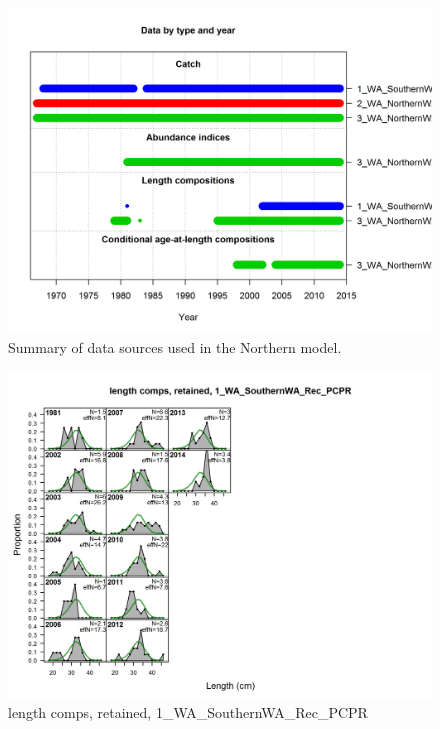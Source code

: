 \documentclass[12pt,]{article}
\begin{document}
\begin{figure}[htbp]
\centering
\includegraphics{r4ss/plots_mod1/data_plot.png}
\caption{Summary of data sources used in the Northern model.
\label{fig:data_plot}}
\end{figure}

\FloatBarrier

\FloatBarrier

\FloatBarrier

\FloatBarrier

\FloatBarrier

\FloatBarrier

\begin{figure}[htbp]
\centering
\includegraphics{./r4ss/plots_mod1/comp_lenfit_flt1mkt2.png}
\caption{length comps, retained, 1\_WA\_SouthernWA\_Rec\_PCPR
\label{fig:mod1_1_comp_lenfit_flt1mkt2}}
\end{figure}
\end{document}
